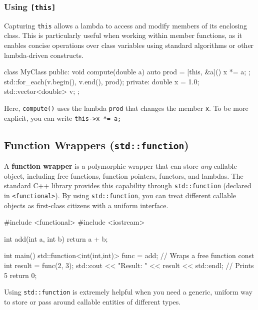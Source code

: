 \subsubsection{Using \texttt{[this]}}

Capturing \texttt{this} allows a lambda to access and modify members of its enclosing class. This is particularly useful when working within member functions, as it enables concise operations over class variables using standard algorithms or other lambda-driven constructs.

\vspace{-0.5em}

\begin{codeblock}[language=C++]
class MyClass {
public:
    void compute(double a) {
        auto prod = [this, &a]() { x *= a; };
        std::for_each(v.begin(), v.end(), prod);
    }
private:
    double x = 1.0;
    std::vector<double> v;
};
\end{codeblock}

\vspace{-0.5em}

Here, \texttt{compute()} uses the lambda \texttt{prod} that changes the member \texttt{x}. To be more explicit, you can write \texttt{this->x *= a;}

\subsection{Function Wrappers (\texttt{std::function})} \label{function-wrappers}
A \textbf{function wrapper} is a polymorphic wrapper that can store \textit{any} callable object, including free functions, function pointers, functors, and lambdas. The standard C++ library provides this capability through \texttt{std::function} (declared in \texttt{<functional>}). By using \texttt{std::function}, you can treat different callable objects as first-class citizens with a uniform interface.

\begin{codeblock}[language=C++]
#include <functional>
#include <iostream>

int add(int a, int b) {
    return a + b;
}

int main() {
    std::function<int(int,int)> func = add;  // Wraps a free function
    const int result = func(2, 3);
    std::cout << "Result: " << result << std::endl;  // Prints 5
    return 0;
}
\end{codeblock}

Using \texttt{std::function} is extremely helpful when you need a generic, uniform way to store or pass around callable entities of different types.

